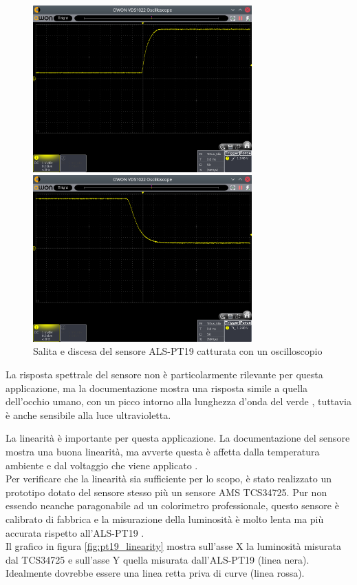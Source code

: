 \begin{figure}[h!]
	\centering
	\includegraphics[width=0.75\textwidth]{Dispositivo_files/sensor_scope_rise.png}
	
	\vspace{0.2cm}
	
	\includegraphics[width=0.75\textwidth]{Dispositivo_files/sensor_scope_fall.png}
	\caption{Salita e discesa del sensore ALS-PT19 catturata con un oscilloscopio}
	\label{fig:sensor_scope_risefall}
\end{figure}

La risposta spettrale del sensore non è particolarmente rilevante per questa applicazione, ma la documentazione mostra una risposta simile a quella dell'occhio umano, con un picco intorno alla lunghezza d'onda del verde \cite{als_pt19_datasheet}, tuttavia è anche sensibile alla luce ultravioletta.

La linearità è importante per questa applicazione. La documentazione del sensore mostra una buona linearità, ma avverte questa è affetta dalla temperatura ambiente e dal voltaggio che viene applicato \cite{als_pt19_datasheet}.\\
Per verificare che la linearità sia sufficiente per lo scopo, è stato realizzato un prototipo dotato del sensore stesso più un sensore AMS TCS34725. Pur non essendo neanche paragonabile ad un colorimetro professionale, questo sensore è calibrato di fabbrica e la misurazione della luminosità è molto lenta ma più accurata rispetto all'ALS-PT19 \cite{tcs34725_datasheet}.\\
Il grafico in figura \ref{fig:pt19_linearity} mostra sull'asse X la luminosità misurata dal TCS34725 e sull'asse Y quella misurata dall'ALS-PT19 (linea nera). Idealmente dovrebbe essere una linea retta priva di curve (linea rossa).

